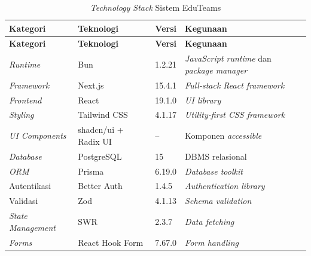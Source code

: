 \begin{longtable}{|p{}|p{}|p{}|p{}|}
	\caption{\textit{Technology Stack} Sistem EduTeams}
	\label{tab:3.tech-stack}                                                                                                     \\
	\hline
	\textbf{Kategori}         & \textbf{Teknologi}   & \textbf{Versi} & \textbf{Kegunaan}                                        \\
	\hline
	\endfirsthead
	\hline
	\textbf{Kategori}         & \textbf{Teknologi}   & \textbf{Versi} & \textbf{Kegunaan}                                        \\
	\hline
	\endhead
	\hline
	\endfoot
	\hline
	\endlastfoot
	\textit{Runtime}          & Bun                  & 1.2.21         & \textit{JavaScript runtime} dan \textit{package manager} \\
	\hline
	\textit{Framework}        & Next.js              & 15.4.1         & \textit{Full-stack React framework}                      \\
	\hline
	\textit{Frontend}         & React                & 19.1.0         & \textit{UI library}                                      \\
	\hline
	\textit{Styling}          & Tailwind CSS         & 4.1.17         & \textit{Utility-first CSS framework}                     \\
	\hline
	\textit{UI Components}    & shadcn/ui + Radix UI & --             & Komponen \textit{accessible}                             \\
	\hline
	\textit{Database}         & PostgreSQL           & 15             & DBMS relasional                                          \\
	\hline
	\textit{ORM}              & Prisma               & 6.19.0         & \textit{Database toolkit}                                \\
	\hline
	Autentikasi               & Better Auth          & 1.4.5          & \textit{Authentication library}                          \\
	\hline
	Validasi                  & Zod                  & 4.1.13         & \textit{Schema validation}                               \\
	\hline
	\textit{State Management} & SWR                  & 2.3.7          & \textit{Data fetching}                                   \\
	\hline
	\textit{Forms}            & React Hook Form      & 7.67.0         & \textit{Form handling}                                   \\

\end{longtable}
